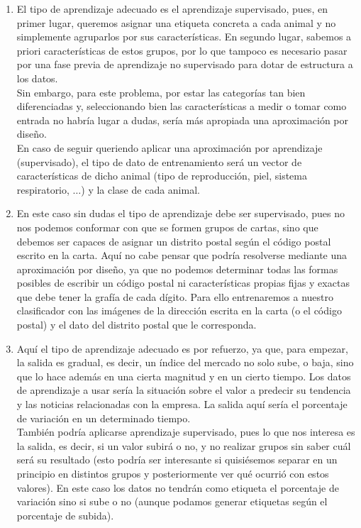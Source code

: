 \documentclass[11pt,leqno]{article}
\theoremstyle{definition}
\begin{document}
\begin{solucion} \textbf{ }
\begin{enumerate}[a]
\item El tipo de aprendizaje adecuado es el aprendizaje supervisado, pues, en primer lugar, queremos asignar una etiqueta concreta a cada animal y no  simplemente agruparlos por sus características. En segundo lugar, sabemos a priori características de estos grupos, por lo que tampoco es necesario pasar por una fase previa de aprendizaje no supervisado para dotar de estructura a los datos.\\
Sin embargo, para este problema, por estar las categorías tan bien diferenciadas y, seleccionando bien las características a medir o tomar como entrada no habría lugar a dudas, sería más apropiada una aproximación por diseño.\\
En caso de seguir queriendo aplicar una aproximación por aprendizaje (supervisado), el tipo de dato de entrenamiento será un vector de características de dicho animal (tipo de reproducción, piel, sistema respiratorio, $\dots$) y la clase de cada animal.
\item En este caso sin dudas el tipo de aprendizaje debe ser supervisado, pues no nos podemos conformar con que se formen grupos de cartas, sino que debemos ser capaces de asignar un distrito postal según el código postal escrito en la carta. Aquí no cabe pensar que podría resolverse mediante una aproximación por diseño, ya que no podemos determinar todas las formas posibles de escribir un código postal ni características propias fijas y exactas que debe tener la grafía de cada dígito. Para ello entrenaremos a nuestro clasificador con las imágenes de la dirección escrita en la carta (o el código postal) y el dato del distrito postal que le corresponda.
\item Aquí el tipo de aprendizaje adecuado es por refuerzo, ya que, para empezar, la salida es gradual, es decir, un índice del mercado no solo sube, o baja, sino que lo hace además en una cierta magnitud y en un cierto tiempo. Los datos de aprendizaje a usar sería la situación sobre el valor a predecir su tendencia y las noticias relacionadas con la empresa. La salida aquí sería el porcentaje de variación en un determinado tiempo.\\
También podría aplicarse aprendizaje supervisado, pues lo que nos interesa es la salida, es decir, si un valor subirá o no, y no realizar grupos sin saber cuál será su resultado (esto podría ser interesante si quisiésemos separar en un principio en distintos grupos y posteriormente ver qué ocurrió con estos valores). En este caso los datos no tendrán como etiqueta el porcentaje de variación sino si sube o no (aunque podamos generar etiquetas según el porcentaje de subida).
\end{enumerate}
\end{solucion}
\end{document}
